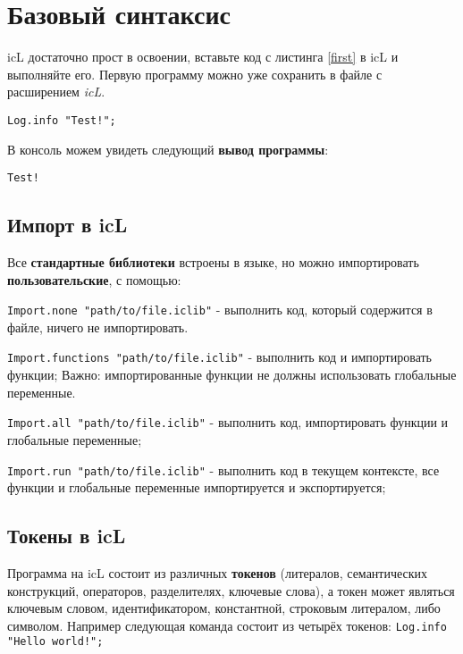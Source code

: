 

\section{Базовый синтаксис}

icL достаточно прост в освоении, вставьте код с листинга \ref{first} в icL и выполняйте его. Первую программу можно уже сохранить в файле с расширением \textit{icL}.

\begin{lstlisting}[caption=Первая программа, label=first]
Log.info "Test!";
\end{lstlisting}

В консоль можем увидеть следующий \textbf{вывод программы}:

\begin{lstlisting}[numbers=none]
Test!
\end{lstlisting}

\subsection{Импорт в icL}

Все \textbf{стандартные библиотеки} встроены в языке, но можно импортировать \textbf{пользовательские}, с помощью:

\begin{icItems}
\item
	\lstinline|Import.none "path/to/file.iclib"| - выполнить код, который содержится в файле, ничего не импортировать.
\item
	\lstinline|Import.functions "path/to/file.iclib"| - выполнить код и импортировать функции; {\color{red}Важно:} импортированные функции не должны использовать глобальные переменные.
\item
	\lstinline|Import.all "path/to/file.iclib"| -  выполнить код, импортировать функции и глобальные переменные;
\item
	\lstinline|Import.run "path/to/file.iclib"| - выполнить код в текущем контексте, все функции и глобальные переменные импортируется и экспортируется;
\end{icItems}

\subsection{Токены в icL}

Программа на icL состоит из различных \textbf{токенов} (литералов, семантических конструкций, операторов, разделителях, ключевые слова), а токен может являться ключевым словом, идентификатором, константной, строковым литералом, либо символом. Например следующая команда состоит из четырёх токенов: \lstinline|Log.info "Hello world!";|

